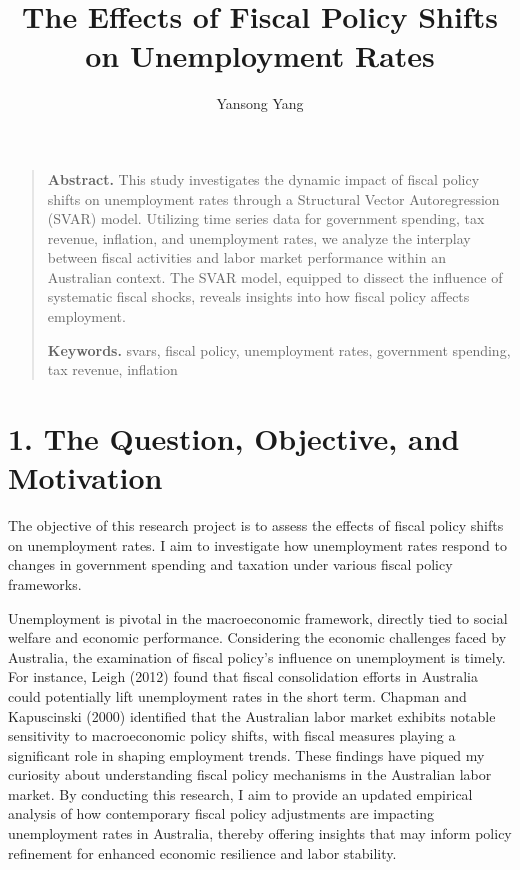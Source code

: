 \documentclass[
  letterpaper,
  DIV=11,
  numbers=noendperiod]{scrartcl}
\title{The Effects of Fiscal Policy Shifts on Unemployment Rates}
\author{Yansong Yang}
\date{}
\begin{document}
\maketitle
\ifdefined\Shaded\renewenvironment{Shaded}{\begin{tcolorbox}[sharp corners, interior hidden, breakable, frame hidden, boxrule=0pt, enhanced, borderline west={3pt}{0pt}{shadecolor}]}{\end{tcolorbox}}\fi

\begin{quote}
\textbf{Abstract.} This study investigates the dynamic impact of fiscal
policy shifts on unemployment rates through a Structural Vector
Autoregression (SVAR) model. Utilizing time series data for government
spending, tax revenue, inflation, and unemployment rates, we analyze the
interplay between fiscal activities and labor market performance within
an Australian context. The SVAR model, equipped to dissect the influence
of systematic fiscal shocks, reveals insights into how fiscal policy
affects employment.

\textbf{Keywords.} svars, fiscal policy, unemployment rates, government
spending, tax revenue, inflation
\end{quote}

\hypertarget{the-question-objective-and-motivation}{%
\section{1. The Question, Objective, and
Motivation}\label{the-question-objective-and-motivation}}

The objective of this research project is to assess the effects of
fiscal policy shifts on unemployment rates. I aim to investigate how
unemployment rates respond to changes in government spending and
taxation under various fiscal policy frameworks.

Unemployment is pivotal in the macroeconomic framework, directly tied to
social welfare and economic performance. Considering the economic
challenges faced by Australia, the examination of fiscal policy's
influence on unemployment is timely. For instance, Leigh (2012) found
that fiscal consolidation efforts in Australia could potentially lift
unemployment rates in the short term. Chapman and Kapuscinski (2000)
identified that the Australian labor market exhibits notable sensitivity
to macroeconomic policy shifts, with fiscal measures playing a
significant role in shaping employment trends. These findings have
piqued my curiosity about understanding fiscal policy mechanisms in the
Australian labor market. By conducting this research, I aim to provide
an updated empirical analysis of how contemporary fiscal policy
adjustments are impacting unemployment rates in Australia, thereby
offering insights that may inform policy refinement for enhanced
economic resilience and labor stability.
\end{document}
